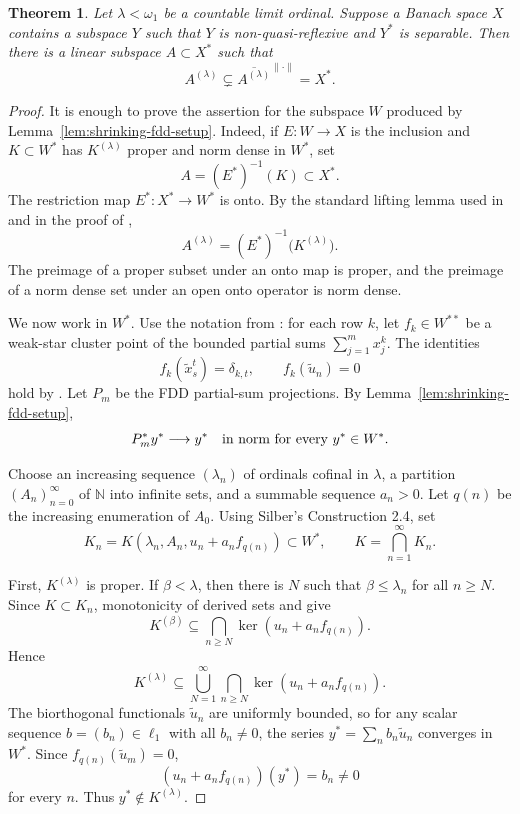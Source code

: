 \documentclass[11pt]{article}
\newtheorem{theorem}{Theorem}
\newcommand{\N}{\mathbb{N}}
\newcommand{\clnorm}[1]{\overline{#1}^{\|\cdot\|}}
\begin{document}
\begin{theorem}
Let \(\lambda<\omega_1\) be a countable limit ordinal.  Suppose a Banach space
\(X\) contains a subspace \(Y\) such that \(Y\) is non-quasi-reflexive and
\(Y^*\) is separable.  Then there is a linear subspace \(A\subset X^*\) such
that
\[
  A^{(\lambda)}\subsetneq \clnorm{A^{(\lambda)}}=X^* .
\]
\end{theorem}

\begin{proof}
It is enough to prove the assertion for the subspace \(W\) produced by
Lemma~\ref{lem:shrinking-fdd-setup}.  Indeed, if \(E:W\to X\) is the inclusion
and \(K\subset W^*\) has \(K^{(\lambda)}\) proper and norm dense in \(W^*\), set
\[
  A=(E^*)^{-1}(K)\subset X^* .
\]
The restriction map \(E^*:X^*\to W^*\) is onto.  By the standard lifting lemma
used in \cite[Lemma 1]{Ostrovskii1993} and in the proof of
\cite[Theorem 2.1]{Silber2022},
\[
  A^{(\lambda)}=(E^*)^{-1}\bigl(K^{(\lambda)}\bigr).
\]
The preimage of a proper subset under an onto map is proper, and the preimage
of a norm dense set under an open onto operator is norm dense.

We now work in \(W^*\).  Use the notation from \cite{Silber2022}: for each
row \(k\), let \(f_k\in W^{**}\) be a weak-star cluster point of the bounded
partial sums \(\sum_{j=1}^m x_j^k\).  The identities
\[
  f_k(\widetilde x_s^t)=\delta_{k,t},
  \qquad
  f_k(\widetilde u_n)=0
\]
hold by \cite[Lemma 2.7]{Silber2022}.  Let \(P_m\) be the FDD partial-sum
projections.  By Lemma~\ref{lem:shrinking-fdd-setup},
\[
  P_m^*y^*\longrightarrow y^*
  \quad\hbox{in norm for every }y^*\in W^* .
\]

Choose an increasing sequence \((\lambda_n)\) of ordinals cofinal in
\(\lambda\), a partition \((A_n)_{n=0}^\infty\) of \(\N\) into infinite sets,
and a summable sequence \(a_n>0\).  Let \(q(n)\) be the increasing enumeration
of \(A_0\).  Using Silber's Construction 2.4, set
\[
  K_n=K(\lambda_n,A_n,u_n+a_nf_{q(n)})\subset W^*,
  \qquad
  K=\bigcap_{n=1}^{\infty}K_n .
\]

First, \(K^{(\lambda)}\) is proper.  If \(\beta<\lambda\), then there is \(N\)
such that \(\beta\leq\lambda_n\) for all \(n\geq N\).  Since \(K\subset K_n\),
monotonicity of derived sets and \cite[Proposition 2.5]{Silber2022} give
\[
  K^{(\beta)}
  \subseteq
  \bigcap_{n\geq N}\ker(u_n+a_nf_{q(n)}).
\]
Hence
\[
  K^{(\lambda)}
  \subseteq
  \bigcup_{N=1}^{\infty}\bigcap_{n\geq N}\ker(u_n+a_nf_{q(n)}).
\]
The biorthogonal functionals \(\widetilde u_n\) are uniformly bounded, so for
any scalar sequence \(b=(b_n)\in\ell_1\) with all \(b_n\neq0\), the series
\(y^*=\sum_n b_n\widetilde u_n\) converges in \(W^*\).  Since
\(f_{q(n)}(\widetilde u_m)=0\),
\[
  (u_n+a_nf_{q(n)})(y^*)=b_n\neq0
\]
for every \(n\).  Thus \(y^*\notin K^{(\lambda)}\).


\end{proof}
\end{document}
